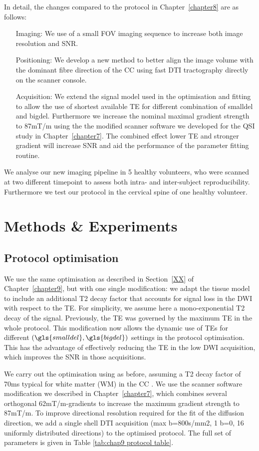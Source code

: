 In detail, the changes compared to the protocol in Chapter~\ref{chapter8} are as follows:
\begin{enumerate}
\item[Imaging: ] We use of a small \gls{FOV} imaging sequence to increase both image resolution and SNR.
\item[Positioning: ] We develop a new method to better align the image volume with the dominant fibre direction of the CC using fast DTI tractography directly on the scanner console.
\item[Acquisition: ] We extend the signal model used in the optimisation and fitting to allow the use of shortest available \gls{TE} for different combination of \gls{smalldel} and \gls{bigdel}. Furthermore we increase the nominal maximal gradient strength to 87mT/m using the the modified scanner software we developed for the QSI study in Chapter~\ref{chapter7}. The combined effect lower \gls{TE} and stronger gradient will increase SNR and aid the performance of the parameter fitting routine.
\end{enumerate}
We analyse our new imaging pipeline in 5 healthy volunteers, who were scanned at two different timepoint to assess both intra- and inter-subject reproducibility. Furthermore we test our protocol in the cervical spine of one healthy volunteer. 


\section{Methods \& Experiments}
\subsection*{Protocol optimisation}
We use the same \SFasym{} optimisation as described in Section~\ref{XX} of Chapter~\ref{chapter9}, but with one single modification: we adapt the tissue model to include an additional T2 decay factor that accounts for signal loss in the DWI with respect to the \gls{TE}. For simplicity, we assume here a mono-exponential T2 decay of the signal. Previously, the \gls{TE} was governed by the maximum TE in the whole protocol. This modification now allows the dynamic use of \glspl{TE} for different $(\gls{smalldel},\gls{bigdel})$ settings in the protocol optimisation. This has the advantage of effectively reducing the \gls{TE} in the low DWI acquisition, which improves the SNR in those acquisitions.

We carry out the optimisation using as before, assuming a T2 decay factor of 70ms typical for white matter (WM) in the CC \cite{cite stanisz relaxation times paper}. We use the scanner software modification we described in Chapter~\ref{chapter7}, which combines several orthogonal 62mT/m-gradients to increase the maximum gradient strength to 87mT/m. To improve directional resolution required for the fit of the diffusion direction, we add a single shell DTI acquisition (max b=800s/mm2, 1 b=0, 16 uniformly distributed directions) to the optimised protocol. The full set of parameters is given in Table \ref{tab:chap9 protocol table}.

